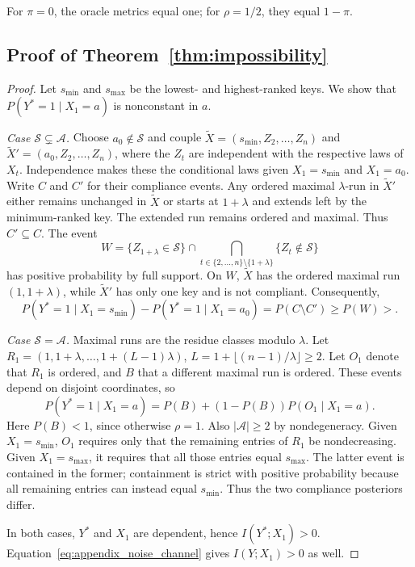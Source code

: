 \documentclass{article} %
\theoremstyle{plain}
\theoremstyle{definition}
\theoremstyle{remark}
\begin{document}
For $\pi=0$, the oracle metrics equal one; for $\rho=1/2$, they equal $1-\pi$.

\subsection{Proof of Theorem~\ref{thm:impossibility}}
\label{appendix:proof_impossibility}

\begin{proof}
Let $s_{\min}$ and $s_{\max}$ be the lowest- and highest-ranked keys.
We show that $P(Y^*=1\mid X_1=a)$ is nonconstant in $a$.

\textit{Case $\mathcal S\subsetneq\mathcal A$.}
Choose $a_0\notin\mathcal S$ and couple
$\widetilde X=(s_{\min},Z_2,\ldots,Z_n)$ and
$\widetilde X'=(a_0,Z_2,\ldots,Z_n)$, where the $Z_t$ are independent
with the respective laws of $X_t$. Independence makes these the conditional
laws given $X_1=s_{\min}$ and $X_1=a_0$.
Write $C$ and $C'$ for their compliance events. Any ordered maximal
$\lambda$-run in $\widetilde X'$ either remains unchanged in $\widetilde X$
or starts at $1+\lambda$ and extends left by the minimum-ranked key.
The extended run remains ordered and maximal. Thus $C'\subseteq C$.
The event
\[
W=\{Z_{1+\lambda}\in\mathcal S\}
\cap\bigcap_{t\in\{2,\ldots,n\}\setminus\{1+\lambda\}}
\{Z_t\notin\mathcal S\}
\]
has positive probability by full support. On $W$, $\widetilde X$ has the
ordered maximal run $(1,1+\lambda)$, while $\widetilde X'$ has only one
key and is not compliant. Consequently,
\[
P(Y^*=1\mid X_1=s_{\min})-P(Y^*=1\mid X_1=a_0)
=P(C\setminus C')\geq P(W)>.
\]

\textit{Case $\mathcal S=\mathcal A$.}
Maximal runs are the residue classes modulo $\lambda$. Let
$R_1=(1,1+\lambda,\ldots,1+(L-1)\lambda)$,
$L=1+\lfloor(n-1)/\lambda\rfloor\geq2$.
Let $O_1$ denote that $R_1$ is ordered, and $B$ that a different maximal
run is ordered. These events depend on disjoint coordinates, so
\[
P(Y^*=1\mid X_1=a)=P(B)+(1-P(B))P(O_1\mid X_1=a).
\]
Here $P(B)<1$, since otherwise $\rho=1$. Also $|\mathcal A|\geq2$ by
nondegeneracy. Given $X_1=s_{\min}$, $O_1$ requires only that the
remaining entries of $R_1$ be nondecreasing. Given $X_1=s_{\max}$, it
requires that all those entries equal $s_{\max}$. The latter event is
contained in the former; containment is strict with positive probability
because all remaining entries can instead equal $s_{\min}$.
Thus the two compliance posteriors differ.

In both cases, $Y^*$ and $X_1$ are dependent, hence $I(Y^*;X_1)>0$.
Equation~\eqref{eq:appendix_noise_channel} gives $I(Y;X_1)>0$ as well.
\end{proof}
\end{document}
